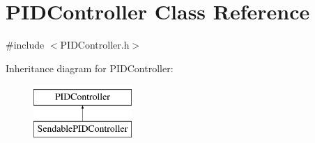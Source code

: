\hypertarget{classPIDController}{
\section{PIDController Class Reference}
\label{classPIDController}
}


{\ttfamily \#include $<$PIDController.h$>$}

Inheritance diagram for PIDController:\begin{figure}[H]
\begin{center}
\leavevmode
\includegraphics[height=2.000000cm]{classPIDController}
\end{center}
\end{figure}
